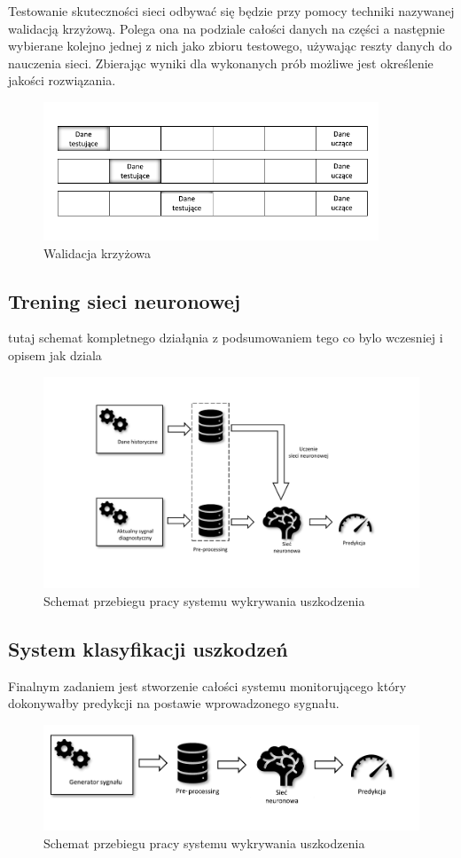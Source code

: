 \documentclass[12pt, a4paper, oneside]{article}
\begin{document}
	Testowanie skuteczności sieci odbywać się będzie przy pomocy techniki nazywanej walidacją krzyżową. Polega ona na podziale całości danych na części a następnie wybierane kolejno jednej z nich jako zbioru testowego, używając reszty danych do nauczenia sieci. Zbierając wyniki dla wykonanych prób możliwe jest określenie jakości rozwiązania. 
	\begin{figure}[H]
		\centering
		\includegraphics[width=10cm]{images/walidacja_c.pdf}
		\caption{Walidacja krzyżowa}
	\end{figure}

	\subsection{Trening sieci neuronowej}
	tutaj schemat kompletnego działąnia z podsumowaniem tego co bylo wczesniej i opisem jak dziala
	\begin{figure}[H]
		\centering
		\includegraphics[width=16cm]{images/total_proc.pdf}
		\caption{Schemat przebiegu pracy systemu wykrywania uszkodzenia}
	\end{figure}
	\subsection{System klasyfikacji uszkodzeń}
	Finalnym zadaniem jest stworzenie całości systemu monitorującego który dokonywałby predykcji na postawie wprowadzonego sygnału. 
	\begin{figure}[H]
		\centering
		\includegraphics[width=14cm]{images/workflow_c.pdf}
		\caption{Schemat przebiegu pracy systemu wykrywania uszkodzenia}
	\end{figure}
\end{document}
